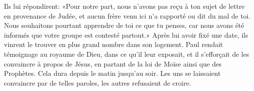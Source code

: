 Ils lui répondirent:
	«Pour notre part,
		nous n’avons pas reçu à ton sujet de lettre en provenance de Judée,
	et aucun frère venu ici n’a rapporté ou dit du mal de toi.
Nous souhaitons pourtant apprendre de toi ce que tu penses,
	car nous avons été informés que votre groupe est contesté partout.»
Après lui avoir fixé une date,
	ils vinrent le trouver en plus grand nombre dans son logement.
Paul rendait témoignage au royaume de Dieu, dans ce qu’il leur exposait,
	et il s’efforçait de les convaincre à propos de Jésus,
	en partant de la loi de Moïse ainsi que des Prophètes.
Cela dura depuis le matin jusqu’au soir.
	Les uns se laissaient convaincre par de telles paroles,
	les autres refusaient de croire.
